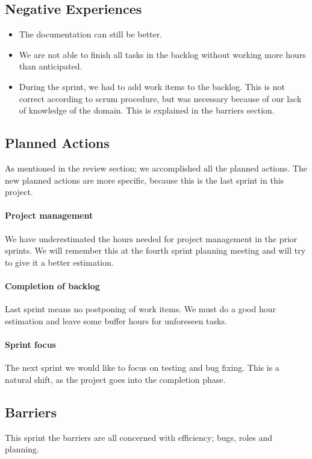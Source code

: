 \subsection{Negative Experiences}
\begin{itemize}
	\item The documentation can still be better.
	\item We are not able to finish all tasks in the backlog without working more hours than anticipated.
	\item During the sprint, we had to add work items to the backlog. This is not correct according to \Gls{scrum} procedure, but was necessary because of our lack of knowledge of the domain. This is explained in the barriers section.  
\end{itemize}

\subsection{Planned Actions}
As mentioned in the review section; we accomplished all the planned actions. The new planned actions are more specific, because this is the last sprint in this project.

\paragraph{Project management}
We have underestimated the hours needed for project management in the prior sprints. We will remember this at the fourth sprint planning meeting and will try to give it a better estimation.

\paragraph{Completion of backlog}
Last sprint means no postponing of work items. We must do a good hour estimation and leave some buffer hours for unforeseen tasks.

\paragraph{Sprint focus}
The next sprint we would like to focus on testing and bug fixing. This is a natural shift, as the project goes into the completion phase. 

\subsection{Barriers}
This sprint the barriers are all concerned with efficiency; bugs, roles and planning.

